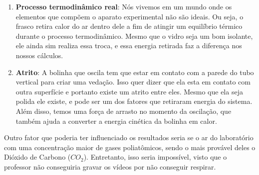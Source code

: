 \begin{enumerate}
    \item \textbf{Processo termodinâmico real}: Nós vivemos em um mundo onde os elementos que compõem o aparato experimental não são ideais. Ou seja, o frasco retira calor do ar dentro dele a fim de atingir um equilíbrio térmico durante o processo termodinâmico. Mesmo que o vidro seja um bom isolante, ele ainda sim realiza essa troca, e essa energia retirada faz a diferença nos nossos cálculos.
    \item \textbf{Atrito}: A bolinha que oscila tem que estar em contato com a parede do tubo vertical para criar uma vedação. Isso quer dizer que ela esta em contato com outra superfície e portanto existe um atrito entre eles. Mesmo que ela seja polida ele existe, e pode ser um dos fatores que retiraram energia do sistema. Além disso, temos uma força de arrasto no momento da oscilação, que também ajuda a converter a energia cinética da bolinha em calor.
\end{enumerate}

Outro fator que poderia ter influenciado os resultados seria se o ar do laboratório com uma concentração maior de gases poliatômicos, sendo o mais provável deles o Dióxido de Carbono ($CO_2$). Entretanto, isso seria impossível, visto que o professor não conseguiria gravar os vídeos por não conseguir respirar.
